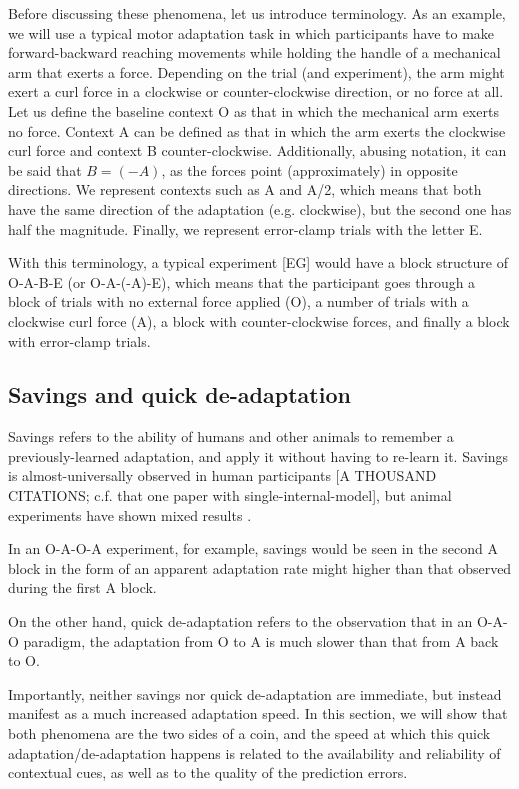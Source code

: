 \documentclass[a4paper,doc,floatsintext,natbib]{apa6}
\begin{document}
Before discussing these phenomena, let us introduce terminology. As an example, we will use a typical motor adaptation task in which participants have to make forward-backward reaching movements while holding the handle of a mechanical arm that exerts a force. Depending on the trial (and experiment), the arm might exert a curl force in a clockwise or counter-clockwise direction, or no force at all. Let us define the baseline context O as that in which the mechanical arm exerts no force. Context A can be defined as that in which the arm exerts the clockwise curl force and context B counter-clockwise. Additionally, abusing notation, it can be said that $B = (-A)$, as the forces point (approximately) in opposite directions. We represent contexts such as A and A/2, which means that both have the same direction of the adaptation (e.g. clockwise), but the second one has half the magnitude. Finally, we represent error-clamp trials with the letter E.

With this terminology, a typical experiment [EG] would have a block structure of O-A-B-E (or O-A-(-A)-E), which means that the participant goes through a block of trials with no external force applied (O), a number of trials with a clockwise curl force (A), a block with counter-clockwise forces, and finally a block with error-clamp trials.

\subsection{Savings and quick de-adaptation}
Savings refers to the ability of humans and other animals to remember a previously-learned adaptation, and apply it without having to re-learn it. Savings is almost-universally observed in human participants [A THOUSAND CITATIONS; c.f. that one paper with single-internal-model], but animal experiments have shown mixed results \citep[e.g.][]{Kojima_Memory_2004}.

In an O-A-O-A experiment, for example, savings would be seen in the second A block in the form of an apparent adaptation rate might higher than that observed during the first A block.

On the other hand, quick de-adaptation refers to the observation that in an O-A-O paradigm, the adaptation from O to A is much slower than that from A back to O.

Importantly, neither savings nor quick de-adaptation are immediate, but instead manifest as a much increased adaptation speed. In this section, we will show that both phenomena are the two sides of a coin, and the speed at which this quick adaptation/de-adaptation happens is related to the availability and reliability of contextual cues, as well as to the quality of the prediction errors.
\end{document}
